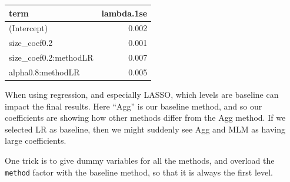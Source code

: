 \documentclass[
]{book}
\newenvironment{Shaded}{\begin{snugshade}}{\end{snugshade}}
\newcommand{\ControlFlowTok}[1]{\textcolor[rgb]{0.13,0.29,0.53}{\textbf{#1}}}
\newcommand{\DecValTok}[1]{\textcolor[rgb]{0.00,0.00,0.81}{#1}}
\newcommand{\FunctionTok}[1]{\textcolor[rgb]{0.13,0.29,0.53}{\textbf{#1}}}
\newcommand{\NormalTok}[1]{#1}
\newcommand{\OtherTok}[1]{\textcolor[rgb]{0.56,0.35,0.01}{#1}}
\newcommand{\SpecialCharTok}[1]{\textcolor[rgb]{0.81,0.36,0.00}{\textbf{#1}}}
\newcommand{\StringTok}[1]{\textcolor[rgb]{0.31,0.60,0.02}{#1}}
\begin{document}
\begin{tabular}{l|r}
\hline
term & lambda.1se\\
\hline
(Intercept) & 0.002\\
\hline
size\_coef0.2 & 0.001\\
\hline
size\_coef0.2:methodLR & 0.007\\
\hline
alpha0.8:methodLR & 0.005\\
\hline
\end{tabular}

When using regression, and especially LASSO, which levels are baseline can impact the final results.
Here ``Agg'' is our baseline method, and so our coefficients are showing how other methods differ from the Agg method.
If we selected LR as baseline, then we might suddenly see Agg and MLM as having large coefficients.

One trick is to give dummy variables for all the methods, and overload the \texttt{method} factor with the baseline method, so that it is always the first level.

\begin{Shaded}
\end{Shaded}
\end{document}
